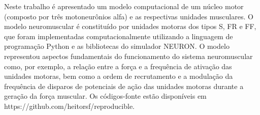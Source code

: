 Neste trabalho é apresentado um modelo computacional de um núcleo motor (composto por três motoneurônios alfa) e as respectivas unidades musculares. O modelo neuromuscular é constituído por unidades motoras dos tipos S, FR e FF, que foram implementadas computacionalmente utilizando a linguagem de programação Python e as bibliotecas do simulador NEURON. O modelo representou aspectos fundamentais do funcionamento do sistema neuromuscular como, por exemplo, a relação entre a força e a frequência de ativação das unidades motoras, bem como a ordem de recrutamento e a modulação da frequência de disparos de potenciais de ação das unidades motoras durante a geração da força muscular. Os códigos-fonte estão disponíveis em https://github.com/heitorsf/reproducible.